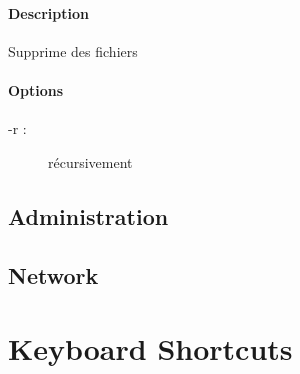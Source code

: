 \documentclass[a4paper, 10pt, onecolumn, openright, oneside]{book}
\begin{document}
\subsection{Description}
Supprime des fichiers
\subsection{Options}
\begin{description}
\item[-r :] récursivement
\end{description}


\chapter{Administration}

\chapter{Network}

\part{Keyboard Shortcuts}
\end{document}
